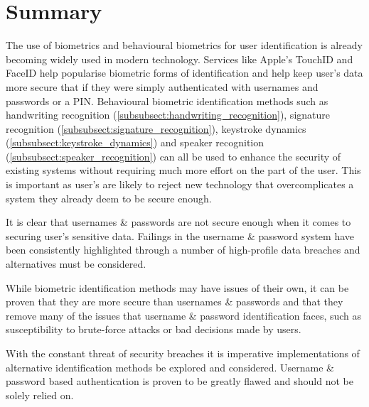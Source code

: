 \documentclass[12pt]{article}
\begin{document}
	\section{Summary}
	The use of biometrics and behavioural biometrics for user identification is already becoming widely used in modern technology. Services like Apple's TouchID and FaceID help popularise biometric forms of identification and help keep user's data more secure that if they were simply authenticated with usernames and passwords or a PIN. Behavioural biometric identification methods such as handwriting recognition (\ref{subsubsect:handwriting_recognition}), signature recognition (\ref{subsubsect:signature_recognition}), keystroke dynamics (\ref{subsubsect:keystroke_dynamics}) and speaker recognition (\ref{subsubsect:speaker_recognition}) can all be used to enhance the security of existing systems without requiring much more effort on the part of the user. This is important as user's are likely to reject new technology that overcomplicates a system they already deem to be secure enough.
	
	It is clear that usernames \& passwords are not secure enough when it comes to securing user's sensitive data. Failings in the username \& password system have been consistently highlighted through a number of high-profile data breaches and alternatives must be considered.
	
	While biometric identification methods may have issues of their own, it can be proven that they are more secure than usernames \& passwords and that they remove many of the issues that username \& password identification faces, such as susceptibility to brute-force attacks or bad decisions made by users.
	
	With the constant threat of security breaches it is imperative implementations of alternative identification methods be explored and considered. Username \& password based authentication is proven to be greatly flawed and should not be solely relied on.
	
	
	 
	
\end{document}
